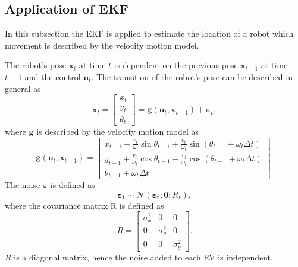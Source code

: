 \documentclass[12pt,oneside,openany,a4paper, %
afrikaans,english,
]{memoir}
\numberwithin{equation}{chapter}
\begin{document}
{\subsection{Application of EKF}
In this subsection the EKF is applied to estimate the location of a robot which movement is described by the velocity motion model.

The robot's pose $\bm{x}_t$ at time $t$ is dependent on the previous pose $\bm{x}_{t-1}$ at time $t-1$ and the control $\bm{u}_t$. The transition of the robot's pose can be described in general as
\begin{equation}\label{eq:stateTranGen}
\bm{x}_t =
\begin{bmatrix}
x_t\\
y_t\\
\theta_t
\end{bmatrix}
= \bm{g}(\bm{u}_t, \bm{x}_{t-1}) + \bm{\varepsilon}_t,
\end{equation}
where $\bm{g}$ is described by the velocity motion model as
\begin{equation}
\bm{g}(\bm{u}_t, \bm{x}_{t-1})=
\begin{bmatrix}
x_{t-1} - \frac{v_t}{\omega_t} \sin\theta_{t-1} + \frac{v_t}{\omega_t} \sin(\theta_{t-1} + \omega_t \Delta t)\\
y_{t-1} + \frac{v_t}{\omega_t} \cos\theta_{t-1} - \frac{v_t}{\omega_t} \cos(\theta_{t-1} + \omega_t \Delta t)\\
\theta_{t-1} + \omega_t \Delta t
\end{bmatrix}.
\end{equation}
The noise $\bm{\varepsilon}$ is defined as
\begin{equation}
\bm{\varepsilon_t} \sim \mathcal{N}(\bm{\varepsilon_t}; \bm{0}; R_t),
\end{equation}
where the covariance matrix R is defined as
\begin{equation}
R =
\begin{bmatrix}
\sigma_x^2 & 0 & 0\\
0 & \sigma_y^2 & 0\\
0 & 0 & \sigma_\theta^2
\end{bmatrix}.
\end{equation}
$R$ is a diagonal matrix, hence the noise added to each RV is independent.

}
\end{document}
